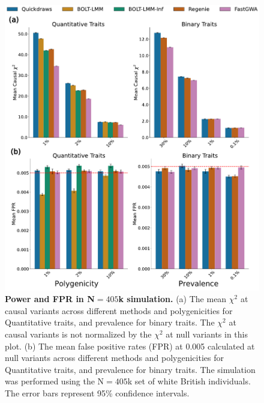 \begin{figure}[h!]
    \centering
    \includegraphics[width=\textwidth]{figures/qd_panel_sim.pdf}
    \caption{\textbf{Power and FPR in N$=405$k simulation.}
    (a) The mean $\chi^2$ at causal variants across different methods and polygenicities for Quantitative traits, and prevalence for binary traits. The $\chi^2$ at causal variants is not normalized by the $\chi^2$ at null variants in this plot.
    (b) The mean false positive rates (FPR) at 0.005 calculated at null variants across different methods and polygenicities for Quantitative traits, and prevalence for binary traits.
    The simulation was performed using the N$=405$k set of white British individuals. The error bars represent 95\% confidence intervals.
    }
    \label{fig:sim_400k}
\end{figure}


